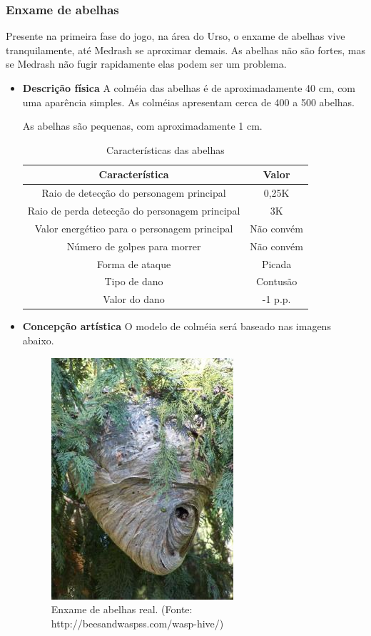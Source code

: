\subsubsection{Enxame de abelhas}
Presente na primeira fase do jogo, na área do Urso, o enxame de abelhas vive tranquilamente, até Medrash se aproximar demais. As abelhas não são fortes, mas se Medrash não fugir rapidamente elas podem ser um problema.
\begin{itemize}
\item {\bf Descrição física}
A colméia das abelhas é de aproximadamente 40 cm, com uma aparência simples. As colméias apresentam cerca de 400 a 500 abelhas.

As abelhas são pequenas, com aproximadamente 1 cm. 
\begin{table}[ht]
\begin{center}
\begin{tabular}{|c|c|}
\hline 
\textbf{Característica} & \textbf{Valor} \\ 
\hline 
Raio de detecção do personagem principal & 0,25K \\ 
\hline 
Raio de perda detecção do personagem principal & 3K \\ 
\hline 
Valor energético para o personagem principal & Não convém\\ 
\hline 
Número de golpes para morrer & Não convém \\ 
\hline 
Forma de ataque & Picada \\ 
\hline 
Tipo de dano & Contusão \\ 
\hline 
Valor do dano & -1 p.p. \\ 
\hline 
\end{tabular} 
\end{center}
\caption{Características das abelhas}
\label{table:abelhas}
\end{table}
\end{itemize}
\begin{itemize}

\item {\bf Concepção artística}
O modelo de colméia será baseado nas imagens abaixo.

 \begin{figure}[ht]
 \centering
 \includegraphics[scale=0.7]{Imagens/enxame01.png}
 \caption{Enxame de abelhas real. (Fonte: http://beesandwaspss.com/wasp-hive/)}
\label{img:abelhas}
\end{figure}
\end{itemize}
\newpage
